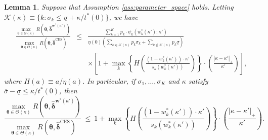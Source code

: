 \documentclass[12pt,a4paper]{article}
\newtheorem{Lemma}{Lemma}
\begin{document}
\begin{Lemma}\label{lem:CES_mis}
Suppose that Assumption \ref{ass:parameter_space} holds. Letting $\mathcal{K}(\kappa) \equiv \{k : \sigma_k \leq \underline{\sigma} + \kappa / t^{\ast}(0)\}$, we have
\begin{eqnarray}
\frac{\max_{\bm{\theta} \in \Theta(\kappa)} R(\bm{\theta},\hat{\bm{\delta}}^{\bm{w}^{\ast}(\kappa')})}{\max_{\bm{\theta} \in \Theta(\kappa)} R(\bm{\theta},\hat{\bm{\delta}}^{\mathrm{CES}})} & \leq & \frac{\sum_{k=1}^K p_k \cdot \psi_k\left( w_k^{\ast}(\kappa') ;\kappa' \right)}{\eta(0) \left( \sum_{k \in \mathcal{K}(\kappa)} p_k \sigma_k + \sum_{k \not\in \mathcal{K}(\kappa)} p_k \underline{\sigma} \right)} \nonumber \\
& &\times \left[ 1 + \max_{k} \left\{ H \left( \frac{(1-w_k^{\ast}(\kappa')) \cdot \kappa' }{s_k \left( w_k^{\ast}(\kappa') \right)} \right) \right\} \cdot \left( \frac{|\kappa - \kappa'|_{+}}{\kappa'} \right) \right], \label{Thm_CES_mis}
\end{eqnarray}
where $H(a) \equiv a/\eta(a)$. In particular, if $\sigma_1, \ldots, \sigma_K$ and $\kappa$ satisfy $\overline{\sigma} - \underline{\sigma} \leq \kappa / t^{\ast}(0)$, then
\[
\frac{\max_{\bm{\theta} \in \Theta(\kappa)} R(\bm{\theta},\hat{\bm{\delta}}^{\bm{w}^{\ast}(\kappa')})}{\max_{\bm{\theta} \in \Theta(\kappa)} R(\bm{\theta},\hat{\bm{\delta}}^{\mathrm{CES}})} \ \leq \ 1 + \max_{k} \left\{ H \left( \frac{(1-w_k^{\ast}(\kappa')) \cdot \kappa' }{s_k \left( w_k^{\ast}(\kappa') \right)} \right) \right\} \cdot \left( \frac{|\kappa - \kappa'|_{+}}{\kappa'} \right).
\]
\end{Lemma}
\end{document}
